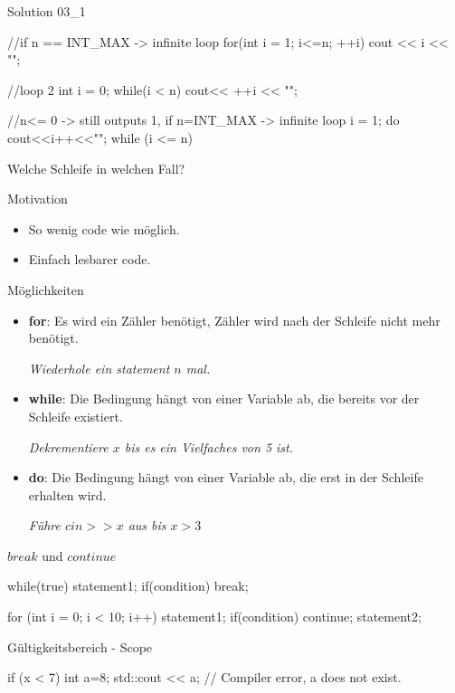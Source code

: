 \documentclass[handout,usenames,dvipsnames]{beamer}
\begin{document}
\begin{frame}[fragile]{Solution 03\_1}
\begin{TFCpp}
//if n == INT_MAX -> infinite loop
for(int i = 1; i<=n; ++i)
	cout << i << "\n";
	
//loop 2
int i = 0;
while(i < n)
	cout<< ++i << "\n";
	
//n<= 0 -> still outputs 1, if n=INT_MAX -> infinite loop
i = 1;
do
	cout<<i++<<"\n";
while (i <= n)
\end{TFCpp}
\end{frame}

\begin{frame}{Welche Schleife in welchen Fall?}
\begin{block}{Motivation}
\begin{itemize}
\item So wenig code wie möglich.
\item Einfach lesbarer code.
\end{itemize}
\end{block}
\begin{block}{Möglichkeiten}
\begin{itemize}
\item \textbf{for}: Es wird ein Zähler benötigt, Zähler wird nach der Schleife nicht mehr benötigt.

\emph{Wiederhole ein statement $n$ mal.}
\item \textbf{while}: Die Bedingung hängt von einer Variable ab, die bereits vor der Schleife existiert.

\emph{Dekrementiere $x$ bis es ein Vielfaches von 5 ist.}
\item \textbf{do}: Die Bedingung hängt von einer Variable ab, die erst in der Schleife erhalten wird.

\emph{Führe $cin>>x$ aus bis $x>3$}
\end{itemize}
\end{block}
\end{frame}

\begin{frame}[fragile]{$break$ und $continue$}
\begin{TFCpp}
while(true){
	statement1;
	if(condition){
		break;
	}
}

for (int i = 0; i < 10; i++){
	statement1;
	if(condition){
		continue;
	}
	statement2;
}
\end{TFCpp}
\end{frame}

\begin{frame}[fragile]{Gültigkeitsbereich - Scope}
\begin{TFCpp}
if (x < 7) {
int a=8;
}
std::cout << a; // Compiler error, a does not exist.
\end{TFCpp}
\end{frame}
\end{document}
